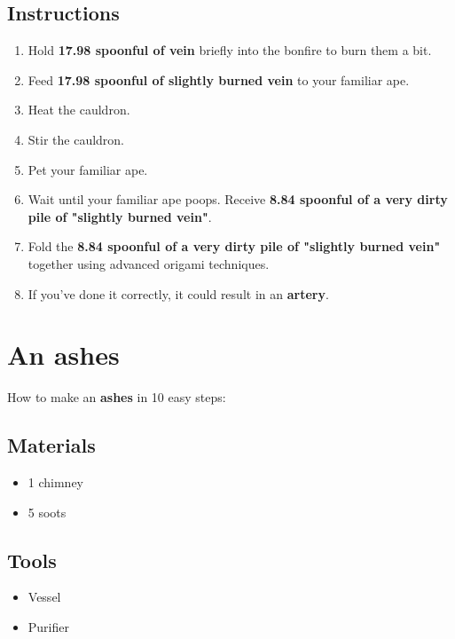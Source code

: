 \documentclass{article}
\begin{document}
\subsection{Instructions}\begin{enumerate}
\item 
Hold \textbf{17.98 spoonful of vein} briefly into the bonfire to burn them a bit.
\item 
Feed \textbf{17.98 spoonful of slightly burned vein} to your familiar ape.
\item 
Heat the cauldron.
\item 
Stir the cauldron.
\item 
Pet your familiar ape.
\item 
Wait until your familiar ape poops. Receive \textbf{8.84 spoonful of a very dirty pile of "slightly burned vein"}.
\item 
Fold the \textbf{8.84 spoonful of a very dirty pile of "slightly burned vein"} together using advanced origami techniques.
\item 
If you've done it correctly, it could result in an \textbf{artery}.
\end{enumerate}
\newpage
\section{An ashes}How to make an \textbf{ashes} in 10 easy steps:

\subsection{Materials}\begin{itemize}
\item 
1 chimney
\item 
5 soots
\end{itemize}
\subsection{Tools}\begin{itemize}
\item 
Vessel
\item 
Purifier
\end{itemize}
\end{document}
